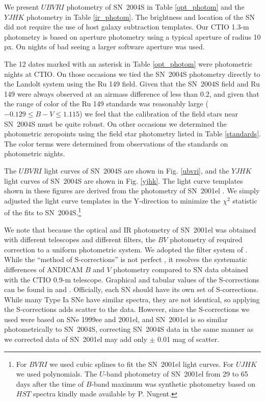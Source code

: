 \documentclass[12pt,preprint,psfig,epsf]{aastex}
\newcommand{\ubvri}{\protect\hbox{$U\!BV\!RI$} }
\newcommand{\bvri}{\protect\hbox{$BV\!RI$} }
\newcommand{\yjhk}{\protect\hbox{$Y\!JHK$} }
\begin{document}
We present \ubvri photometry of SN~2004S in Table \ref{opt_photom} and
the \yjhk photometry in Table \ref{ir_photom}. The brightness and
location of the SN did not require the use of host galaxy subtraction
templates.  Our CTIO 1.3-m photometry is based on aperture photometry
using a typical aperture of radius 10 px.  On nights of bad seeing a
larger software aperture was used.

The 12 dates marked with an asterisk in Table
\ref{opt_photom} were photometric nights at CTIO.  On those occasions we
tied the SN~2004S photometry directly to the Landolt system using the Ru
149 field.  Given that the SN~2004S field and Ru 149 were always observed
at an airmass difference of less than 0.2, and given that the range of
color of the Ru 149 standards was reasonably large ($-0.129 \leq B-V \leq
1.115$) we feel that the calibration of the field stars near SN~2004S must
be quite robust.  On other occasions we determined the photometric
zeropoints using the field star photometry listed in Table
\ref{standards}.  The color terms were determined from observations of
the \citet{Lan92} standards on photometric nights.

The \ubvri light curves of SN~2004S are shown in Fig. \ref{ubvri}, and the
\yjhk light curves of SN~2004S are shown in Fig. \ref{yjhk}. The light
curve templates shown in these figures are derived from the
photometry of SN~2001el \citep{Kri_etal03}. We simply
adjusted the light curve templates in the Y-direction to minimize the
$\chi^2$ statistic of the fits to SN~2004S.\footnote[14]{For \bvri
we used cubic splines to fit the SN~2001el light curves.  For $UJHK$ we used
polynomials.  The $U$-band photometry of SN~2001el from 29 to 65 days after
the time of $B$-band maximum was synthetic photometry based on $HST$ spectra
kindly made available by P. Nugent.}

We note that because the optical and IR photometry of SN~2001el was
obtained with different telescopes and different filters, the $BV$
photometry of \citet{Kri_etal03} required correction to a uniform
photometric system.  We adopted the filter system of
\citet{Bes79, Bes90}. While the ``method of S-corrections'' 
is not perfect \citep{Str_etal02}, it resolves the systematic differences
of ANDICAM $B$ and $V$ photometry compared to SN data obtained with
the CTIO 0.9-m telescope.  Graphical and tabular values of the S-corrections
can be found in \citet{Kri_etal03} and \citet{Kri_etal04c}.  Officially,
each SN should have its own set of S-corrections.  While many Type Ia SNe
have similar spectra, they are not identical, so applying the S-corrections
adds scatter to the data.  However, since the S-corrections we used were
based on SNe 1999ee and 2001el, and SN~2001el is so similar photometrically
to SN~2004S, correcting SN~2004S data in the same manner as we corrected data of 
SN~2001el may add only $\pm$ 0.01 mag of scatter.
\end{document}
